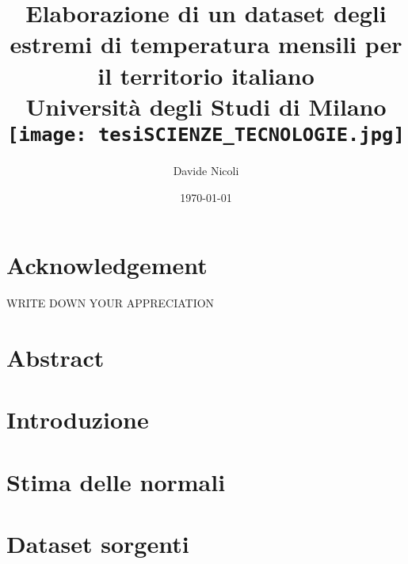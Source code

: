 \documentclass[a4paper, 12pt]{report}
\title{
  {Elaborazione di un dataset degli estremi di temperatura mensili per il territorio italiano}\\
  {\large{Università degli Studi di Milano}}\\
  {\texttt{[image: tesiSCIENZE\_TECNOLOGIE.jpg]}}
}
\author{Davide Nicoli}
\date{\today}
\begin{document}
\maketitle

\chapter*{Acknowledgement}
\noindent WRITE DOWN YOUR APPRECIATION

\chapter*{Abstract}

\tableofcontents
\listoffigures
\listoftables


\chapter{Introduzione}\label{ch:intro}


\chapter{Stima delle normali}\label{ch:stimanormali}


\appendix
\chapter{Dataset sorgenti}\label{app:datasets}


\clearpage
\printbibliography{}
\end{document}
